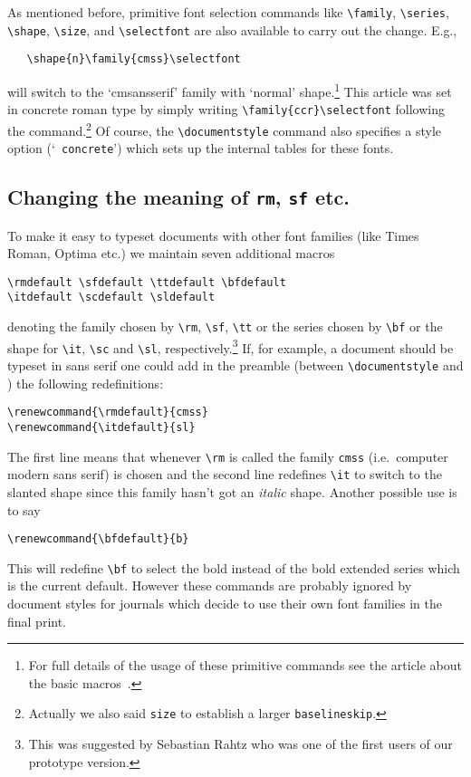  As mentioned before, primitive font selection commands like
 \verb+\family+, \verb+\series+, \verb+\shape+, \verb+\size+, and
 \verb+\selectfont+ are also available to carry out the change.
 E.g.,
 \begin{verbatim}
   \shape{n}\family{cmss}\selectfont
\end{verbatim}
 will
 switch to the `cmsansserif' family with `normal' shape.\footnote{For
 full details of the usage of these primitive commands see the article
 about the basic macros~\cite{basic}.}
 This article was set in concrete roman type
 by simply writing \verb+\family{ccr}+\verb+\selectfont+
 following the \verb++
 command.\footnote{Actually we also said
 {\tt\bslash size\string{10\string}\string{13pt\string}} to
 establish a larger {\tt\bslash baselineskip}.}
 Of course, the
 \verb+\documentstyle+ command also specifies a style option (`{\tt
 concrete}') which sets up the internal tables for these fonts.
 
 \subsection{Changing the meaning of {\tt \protect\bslash rm},
 {\tt \protect\bslash sf} etc.}
 
  To make it easy to typeset documents with other font
  families (like Times Roman, Optima etc.) we maintain
  seven additional macros
  \begin{verbatim}
\rmdefault \sfdefault \ttdefault \bfdefault
\itdefault \scdefault \sldefault
\end{verbatim}
  denoting the family chosen by
  \verb=\rm=, \verb=\sf=, \verb=\tt= or the series chosen
  by \verb=\bf= or the shape for \verb=\it=,
  \verb=\sc= and \verb=\sl=, respectively.\footnote{This
  was suggested by Sebastian Rahtz who was one of the
  first users of our prototype version.}
  If, for example, a document should be typeset in sans serif
  one could add in the preamble (between \verb=\documentstyle=
  and \verb==) the following redefinitions:
\begin{verbatim}
\renewcommand{\rmdefault}{cmss}
\renewcommand{\itdefault}{sl}
\end{verbatim}
The first line means that whenever \verb=\rm= is called the
family {\tt cmss} (i.e.\ computer modern sans serif) is chosen
and the second line redefines \verb=\it= to switch to the slanted
shape since this family hasn't got an {\it italic} shape.
Another possible use is to say
\begin{verbatim}
\renewcommand{\bfdefault}{b}
\end{verbatim}
This will redefine \verb=\bf= to select the bold instead of the
bold extended series which is the current default.
However these commands are
probably ignored by document styles for journals which decide to
use their own font families in the final print.
 
